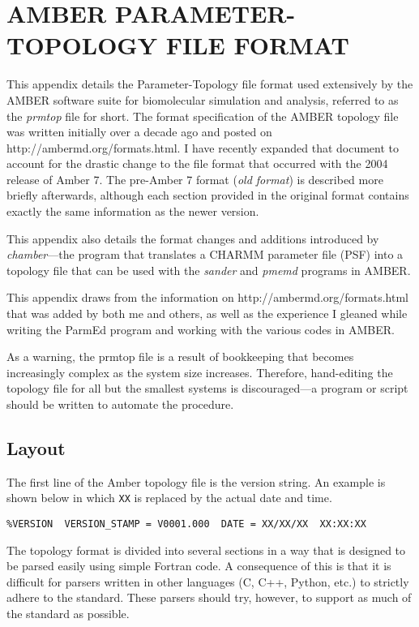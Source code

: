 \chapter{AMBER PARAMETER-TOPOLOGY FILE FORMAT}%
\label{appendixB}

This appendix details the Parameter-Topology file format used extensively by the
AMBER software suite for biomolecular simulation and analysis, referred to as
the \emph{prmtop} file for short. The format specification of the AMBER topology
file was written initially over a decade ago and posted on
http://ambermd.org/formats.html. I have recently expanded that document to
account for the drastic change to the file format that occurred with the 2004
release of Amber 7. The pre-Amber 7 format (\emph{old format}) is described more
briefly afterwards, although each section provided in the original format
contains exactly the same information as the newer version.

This appendix also details the format changes and additions introduced by
\emph{chamber}---the program that translates a CHARMM parameter file (PSF) into
a topology file that can be used with the \emph{sander} and \emph{pmemd}
programs in AMBER.

This appendix draws from the information on http://ambermd.org/formats.html that
was added by both me and others, as well as the experience I gleaned while
writing the ParmEd program and working with the various codes in AMBER.

As a warning, the prmtop file is a result of bookkeeping that becomes
increasingly complex as the system size increases. Therefore, hand-editing the
topology file for all but the smallest systems is discouraged---a program or
script should be written to automate the procedure.

\section{Layout}

The first line of the Amber topology file is the version string. An example is
shown below in which {\tt XX} is replaced by the actual date and time.
\begin{verbatim}
%VERSION  VERSION_STAMP = V0001.000  DATE = XX/XX/XX  XX:XX:XX
\end{verbatim}

The topology format is divided into several sections in a way that is designed
to be parsed easily using simple Fortran code. A consequence of this is that it
is difficult for parsers written in other languages (\eg C, C++, Python, etc.)
to strictly adhere to the standard. These parsers should try, however, to
support as much of the standard as possible.

